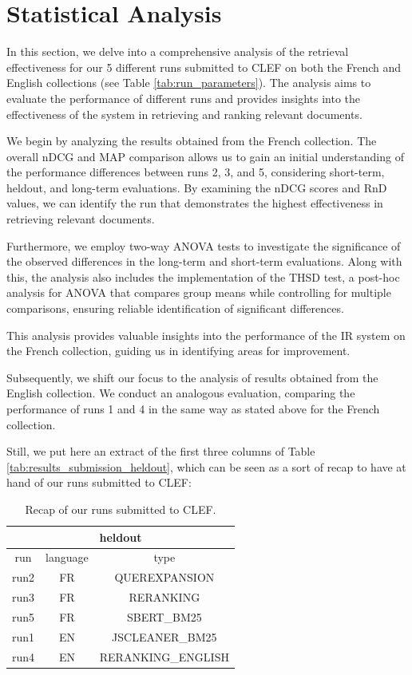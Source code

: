 \section{Statistical Analysis}
\label{sec:analysis}

In this section, we delve into a comprehensive analysis of the retrieval effectiveness for our 5 different runs submitted to \ac{CLEF} on both the French and English collections (see Table \ref{tab:run_parameters}). 
The analysis aims to evaluate the performance of different runs and provides insights into the effectiveness of the system in retrieving and ranking relevant documents.

We begin by analyzing the results obtained from the French collection. 
The overall \ac{nDCG} and \ac{MAP} comparison allows us to gain an initial understanding of the performance differences between runs 2, 3, and 5, considering short-term, heldout, and long-term evaluations. 
By examining the \ac{nDCG} scores and \ac{RnD} values, we can identify the run that demonstrates the highest effectiveness in retrieving relevant documents.

Furthermore, we employ two-way \ac{ANOVA} tests to investigate the significance of the observed differences in the long-term and short-term evaluations.
Along with this, the analysis also includes the implementation of the \acl{THSD} test, a post-hoc analysis for \ac{ANOVA} that compares group means while controlling for multiple comparisons, ensuring reliable identification of significant differences.

This analysis provides valuable insights into the performance of the \ac{IR} system on the French collection, guiding us in identifying areas for improvement.

Subsequently, we shift our focus to the analysis of results obtained from the English collection. 
We conduct an analogous evaluation, comparing the performance of runs 1 and 4 in the same way as stated above for the French collection. 

Still, we put here an extract of the first three columns of Table \ref{tab:results_submission_heldout}, which can be seen as a sort of recap to have at hand of our runs submitted to \ac{CLEF}:

\begin{table}[!h]
    \centering
    \caption{Recap of our runs submitted to \ac{CLEF}.}
    \begin{tabular}{ |c|c|c| }
        \hline
        \hline
        \multicolumn{3}{|c|}{heldout} \\ \hline
        run  & language & type \\ \hline
        run2 &   FR   & QUEREXPANSION \\
        run3 &   FR   & RERANKING \\
        run5 &   FR   & SBERT\_BM25 \\
        \hline
        run1 &   EN   & JSCLEANER\_BM25 \\
        run4 &   EN   & RERANKING\_ENGLISH \\
        \hline
    \end{tabular}
    \label{tab:runs_recap}
\end{table}


